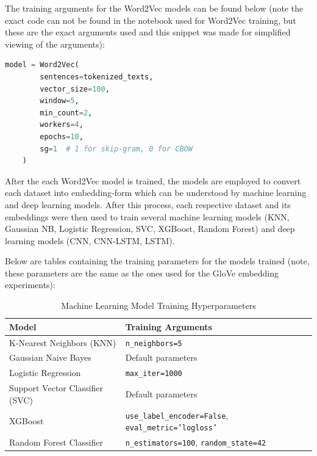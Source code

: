 \documentclass[stu,12pt,floatsintext,donotrepeattitle]{apa7}
\begin{document}
The training arguments for the Word2Vec models can be found below (note the exact code can not be found in the notebook used for Word2Vec training, but these are the exact arguments used and this snippet was made for simplified viewing of the arguments): 
\begin{lstlisting}[language=Python, caption={Word2Vec Models' Training Configuration}]
model = Word2Vec(
        sentences=tokenized_texts,
        vector_size=100,
        window=5,
        min_count=2,
        workers=4,
        epochs=10,
        sg=1  # 1 for skip-gram, 0 for CBOW
    )
\end{lstlisting}

After the each Word2Vec model is trained, the models are employed to convert each dataset into embedding-form which can be understood by machine learning and deep learning models. After this process, each respective dataset and its embeddings were then used to train several machine learning models (KNN, Gaussian NB, Logistic Regression, SVC, XGBoost, Random Forest) and deep learning models (CNN, CNN-LSTM, LSTM). 

Below are tables containing the training parameters for the models trained (note, these parameters are the same as the ones used for the GloVe embedding experiments): 

\begin{table}[H]
    \centering
    \caption{Machine Learning Model Training Hyperparameters}
    \label{tab:ml_model_params}
    \begin{tabular}{l l}
        \hline
        \textbf{Model} & \textbf{Training Arguments} \\
        \hline
        K-Nearest Neighbors (KNN) & \texttt{n\_neighbors=5} \\
        Gaussian Naive Bayes & Default parameters \\
        Logistic Regression & \texttt{max\_iter=1000} \\
        Support Vector Classifier (SVC) & Default parameters \\
        XGBoost & \texttt{use\_label\_encoder=False}, \texttt{eval\_metric='logloss'} \\
        Random Forest Classifier & \texttt{n\_estimators=100}, \texttt{random\_state=42} \\
        \hline
    \end{tabular}
\end{table}
\end{document}
